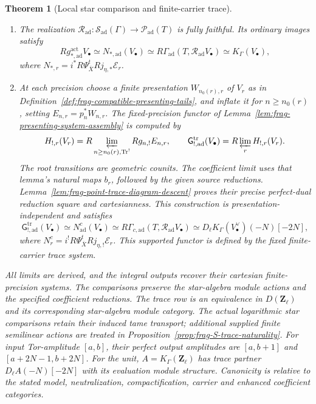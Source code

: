 \documentclass[11pt]{article}
\newtheorem{theorem}{Theorem}[section]
\theoremstyle{definition}
\theoremstyle{remark}
\begin{document}
\begin{theorem}[Local star comparison and finite-carrier trace]
\begin{enumerate}[label=\textup{(\roman*)}]
\item The realization
$\mathcal R_{\mathrm{ad}}:\mathcal S_{\mathrm{ad}}(\Gamma)
\to\mathcal P_{\mathrm{ad}}(T)$ is fully faithful.  Its ordinary images satisfy
\[
 Rg_{*,\mathrm{ad}}^{\mathrm{act}}V_\bullet
 \simeq N_{*,\mathrm{ad}}(V_\bullet)
 \simeq R\Gamma_{\mathrm{ad}}(T,\mathcal R_{\mathrm{ad}}V_\bullet)
 \simeq K_\Gamma(V_\bullet),
\]
where $N_{*,r}=i^*R\Psi^t_{\overline X}Rj_{\eta,*}\mathcal E_r$.
\item At each precision choose a finite presentation $W_{n_0(r),r}$
of $V_r$ as in Definition~\ref{def:frag-compatible-presenting-tails},
and inflate it for $n\ge n_0(r)$, setting $E_{n,r}=p_n^*W_{n,r}$.
The fixed-precision functor of
Lemma~\ref{lem:frag-presenting-system-assembly} is computed by
\[
 H_{!,r}(V_r)=R\varprojlim_{n\ge n_0(r),\operatorname{Tr}^!}Rg_{n,!}E_{n,r},
 \qquad
 \mathsf G_{!,\mathrm{ad}}^{\mathrm{tr}}(V_\bullet)=R\varprojlim_rH_{!,r}(V_r).
\]
The root transitions are geometric counits.  The coefficient limit
uses that lemma's natural maps $b_r$, followed by the given source
reductions.  Lemma~\ref{lem:frag-point-trace-diagram-descent} proves
their precise perfect-dual reduction square and cartesianness.
This construction is presentation-independent and satisfies
\[
 \mathsf G_{!,\mathrm{ad}}^{\mathrm{tr}}(V_\bullet)
 \simeq N^c_{\mathrm{ad}}(V_\bullet)
 \simeq R\Gamma_{c,\mathrm{ad}}(T,\mathcal R_{\mathrm{ad}}V_\bullet)
 \simeq D_\ell K_\Gamma(V_\bullet^\vee)(-N)[-2N],
\]
where $N^c_r=i^!R\Psi^t_{\overline X}Rj_{\eta,!}\mathcal E_r$.
This supported functor is defined by the fixed finite-carrier trace system.
\end{enumerate}
All limits are derived, and the integral outputs recover their
cartesian finite-precision systems.  The comparisons
preserve the star-algebra module actions and the specified coefficient
reductions.  The trace row is an equivalence in $D(\mathbf Z_\ell)$
and its corresponding star-algebra module category.  The actual
logarithmic star comparisons retain their induced tame transport;
additional supplied finite semilinear actions are treated in
Proposition~\ref{prop:frag-S-trace-naturality}.  For input
Tor-amplitude $[a,b]$, their perfect output
amplitudes are $[a,b+1]$ and $[a+2N-1,b+2N]$.
For the unit, $A=K_\Gamma(\mathbf Z_\ell)$ has trace partner
$D_\ell A(-N)[-2N]$ with its evaluation module structure.
Canonicity is relative to the stated model, neutralization,
compactification, carrier and enhanced coefficient categories.
\end{theorem}
\end{document}

